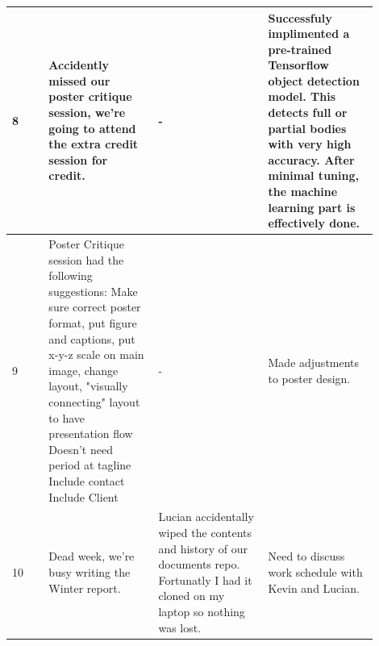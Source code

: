 \documentclass[onecolumn, draftclsnofoot,10pt, compsoc]{IEEEtran}
\begin{document}
\begin{singlespace}
\begin{longtable}{|l|p{0.3\linewidth}|p{0.3\linewidth}|p{0.3\linewidth}|}
		8	&
			Accidently missed our poster critique session, we're going to attend the extra credit session for credit.
			&
			-
			&
			Successfuly implimented a pre-trained Tensorflow object detection model.
			This detects full or partial bodies with very high accuracy.
			After minimal tuning, the machine learning part is effectively done.
			\\\hline

		9	&
			Poster Critique session had the following suggestions: Make sure correct poster format, put figure and captions, put x-y-z scale on main image, change layout, "visually connecting" layout to have presentation flow
			Doesn’t need period at tagline
			Include contact
			Include Client
			&
			-
			&
			Made adjustments to poster design.
			\\\hline

		10	&
			Dead week, we're busy writing the Winter report.
			&
			Lucian accidentally wiped the contents and history of our documents repo.
			Fortunatly I had it cloned on my laptop so nothing was lost.
			&
			Need to discuss work schedule with Kevin and Lucian.
			\\\hline
		\end{longtable}

\end{singlespace}
\end{document}

